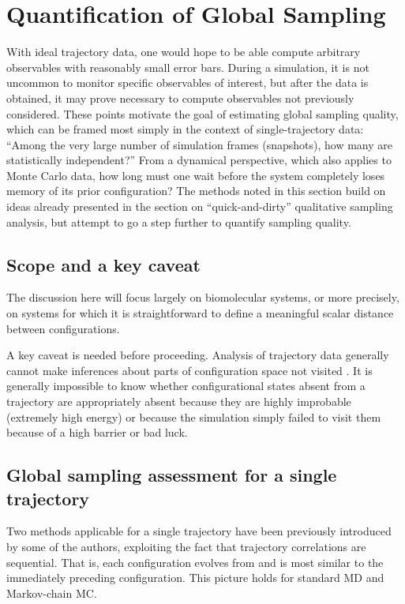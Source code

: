 \section{Quantification of Global Sampling}

With ideal trajectory data, one would hope to be able compute arbitrary observables with reasonably small error bars.
During a simulation, it is not uncommon to monitor specific observables of interest, but after the data is obtained, it may prove necessary to compute observables not previously considered.
These points motivate the goal of estimating global sampling quality, which can be framed most simply in the context of single-trajectory data:
``Among the very large number of simulation frames (snapshots), how many are statistically independent?''
From a dynamical perspective, which also applies to Monte Carlo data, how long must one wait before the system completely loses memory of its prior configuration?
The methods noted in this section build on ideas already presented in the section on ``quick-and-dirty'' qualitative sampling analysis, but attempt to go a step further to quantify sampling quality.

\subsection{Scope and a key caveat}
The discussion here will focus largely on biomolecular systems, or more precisely, on systems for which it is straightforward to define a meaningful scalar distance between configurations.

A key caveat is needed before proceeding.
Analysis of trajectory data generally cannot make inferences about parts of configuration space not visited \cite{Grossfield2009}.
It is generally impossible to know whether configurational states absent from a trajectory are appropriately absent because they are highly improbable (extremely high energy) or because the simulation simply failed to visit them because of a high barrier or bad luck.

\subsection{Global sampling assessment for a single trajectory}
Two methods applicable for a single trajectory have been previously introduced by some of the authors, exploiting the fact that trajectory correlations are sequential.
That is, each configuration evolves from and is most similar to the immediately preceding configuration.
This picture holds for standard MD and Markov-chain MC.


